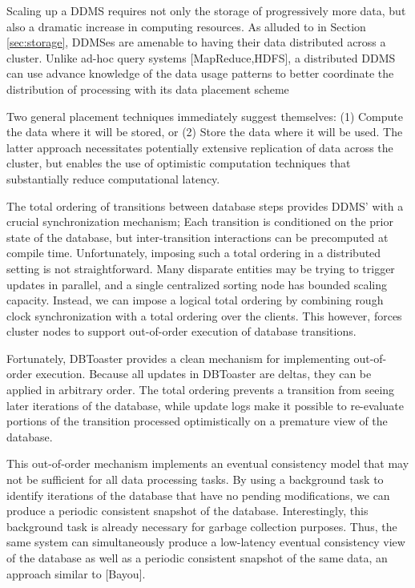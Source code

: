 Scaling up a DDMS requires not only the storage of progressively more data, but also a dramatic increase in computing resources.  As alluded to in Section \ref{sec:storage}, DDMSes are amenable to having their data distributed across a cluster.  Unlike ad-hoc query systems [MapReduce,HDFS], a distributed DDMS can use advance knowledge of the data usage patterns to better coordinate the distribution of processing with its data placement scheme

Two general placement techniques immediately suggest themselves: (1) Compute the data where it will be stored, or (2) Store the data where it will be used.  The latter approach necessitates potentially extensive replication of data across the cluster, but enables the use of optimistic computation techniques that substantially reduce computational latency.

The total ordering of transitions between database steps provides DDMS' with a crucial synchronization mechanism; Each transition is conditioned on the prior state of the database, but inter-transition interactions can be precomputed at compile time.  Unfortunately, imposing such a total ordering in a distributed setting is not straightforward.  Many disparate entities may be trying to trigger updates in parallel, and a single centralized sorting node has bounded scaling capacity.  Instead, we can impose a logical total ordering by combining rough clock synchronization with a total ordering over the clients.  This however, forces cluster nodes to support out-of-order execution of database transitions.

Fortunately, DBToaster provides a clean mechanism for implementing out-of-order execution.  Because all updates in DBToaster are deltas, they can be applied in arbitrary order.  The total ordering prevents a transition from seeing later iterations of the database, while update logs make it possible to re-evaluate portions of the transition processed optimistically on a premature view of the database.  

This out-of-order mechanism implements an eventual consistency model that may not be sufficient for all data processing tasks.  By using a background task to identify iterations of the database that have no pending modifications, we can produce a periodic consistent snapshot of the database.  Interestingly, this background task is already necessary for garbage collection purposes.  Thus, the same system can simultaneously produce a low-latency eventual consistency view of the database as well as a periodic consistent snapshot of the same data, an approach similar to [Bayou].